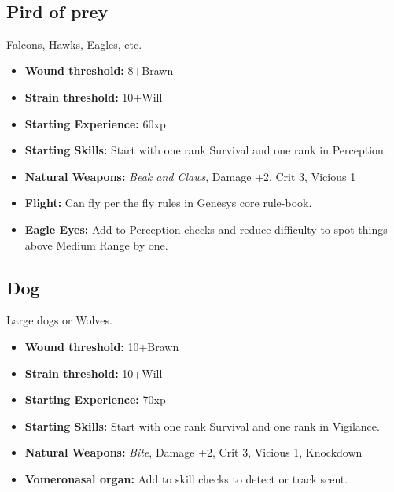 \documentclass{book}
\begin{document}
\mbox{ }

\begin{multicols}{2}
	\subsection{Pird of prey}	
	Falcons, Hawks, Eagles, etc.
	
	\begin{itemize}
		\item \textbf{Wound threshold:} 8+Brawn
		\item \textbf{Strain threshold:} 10+Will
		\item \textbf{Starting Experience:} 60xp
		\item \textbf{Starting Skills:} Start with one rank Survival and one rank in Perception.
		\item \textbf{Natural Weapons:} \textit{Beak and Claws}, Damage +2, Crit 3, Vicious 1
		\item \textbf{Flight:} Can fly per the fly rules in Genesys core rule-book.
		\item \textbf{Eagle Eyes:} Add \BoostDie to Perception checks and reduce difficulty to spot things above Medium Range by one.		
	\end{itemize}

	\subsection{Dog}	
	Large dogs or Wolves.
	
	\begin{itemize}
		\item \textbf{Wound threshold:} 10+Brawn
		\item \textbf{Strain threshold:} 10+Will
		\item \textbf{Starting Experience:} 70xp
		\item \textbf{Starting Skills:} Start with one rank Survival and one rank in Vigilance.
		\item \textbf{Natural Weapons:} \textit{Bite}, Damage +2, Crit 3, Vicious 1, Knockdown
		\item \textbf{Vomeronasal organ:} Add \BoostDie \BoostDie to skill checks to detect or track scent.		
	\end{itemize}
\end{multicols}
\clearpage
\mbox{ }
\end{document}
